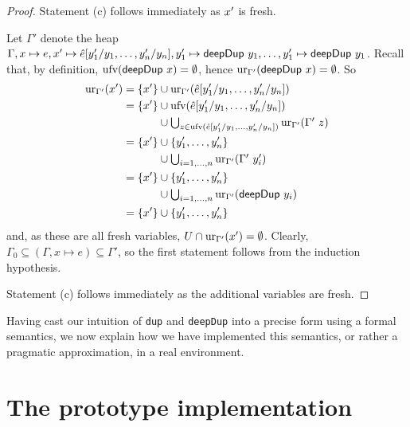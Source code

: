 \documentclass[preprint]{sigplanconf}
\theoremstyle{nonumberplain}
\newtheorem{proof}{Proof}
\newcommand{\li}{\lstinline[style=Haskell]}
\begin{document}
\begin{proof}
Statement (c) follows immediately as $x'$ is fresh.

Let $\Gamma'$ denote the heap $\Gamma, x\mapsto e, x'\mapsto \hat e[y'_1/y_1,\ldots,y'_n/y_n],\allowbreak y'_1 \mapsto \text{\textsf{deepDup}}\ y_1,\allowbreak \ldots,\allowbreak y'_1 \mapsto \text{\textsf{deepDup}}\ y_1$.
Recall that, by definition, $\text{ufv}(\text{\textsf{deepDup}}\ x)=\emptyset$, hence $\text{ur}_{\Gamma'}(\text{\textsf{deepDup}}\ x) = \emptyset$. So
{\allowdisplaybreaks[1]
\begin{align*}
\text{ur}_{\Gamma'}(x')
&= \{x'\} \cup \text{ur}_{\Gamma'}(\hat e[y'_1/y_1,\ldots,y'_n/y_n]) \\
&= \{x'\}
\begin{aligned}[t]
&\cup \text{ufv}(\hat e[y'_1/y_1,\ldots,y'_n/y_n])\\
&\cup \textstyle\bigcup_{z \in \text{ufv}(\hat e[y'_1/y_1,\ldots,y'_n/y_n])} \text{ur}_{\Gamma'}(\Gamma' \ z)
\end{aligned}\\
&= \{x'\}
\begin{aligned}[t]
&\cup \{y'_1,\ldots, y'_n\}\\
&\cup \textstyle\bigcup_{i=1,\ldots,n} \text{ur}_{\Gamma'}(\Gamma'\ y'_i)
\end{aligned}\\
&= \{x'\} 
\begin{aligned}[t]
&\cup \{y'_1,\ldots, y'_n\}\\
&\cup \textstyle\bigcup_{i=1,\ldots,n} \text{ur}_{\Gamma'}(\text{\textsf{deepDup}}\ y_i)
\end{aligned}\\
&= \{x'\} \cup \{y'_1,\ldots, y'_n\}
\end{align*}
}
and, as these are all fresh variables, $U \cap \text{ur}_{\Gamma'}(x') = \emptyset$. Clearly, $\Gamma_0 \subseteq (\Gamma, x\mapsto e) \subseteq \Gamma'$, so the  first statement follows from the induction hypothesis.

Statement (c) follows immediately as the additional variables are fresh.
\end{proof}

Having cast our intuition of \li-dup- and \li-deepDup- into a precise form using a formal semantics, we now explain how we have implemented this semantics, or rather a pragmatic approximation, in a real environment.

\section{The prototype implementation}
\label{sec:prototype}
\end{document}
